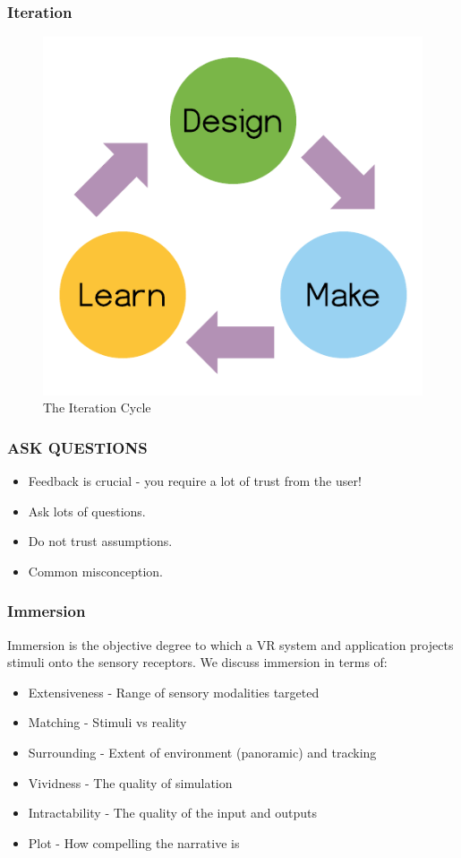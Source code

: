 \begin{frame}
	\frametitle{Iteration}
	\begin{figure}
		\includegraphics[scale=0.4]{assets/iteration.png}
		\caption{The Iteration Cycle}
	\end{figure}
\end{frame}

\begin{frame}
	\frametitle{\textbf{ASK QUESTIONS}}
	\begin{itemize}
		\item Feedback is crucial - you require a lot of trust from the user! 
		\item Ask lots of questions.
		\item Do not trust assumptions. 
		\item Common misconception.
	\end{itemize}
\end{frame}


\begin{frame}
	\frametitle{Immersion}
	Immersion is the objective degree to which a VR system and application projects stimuli onto the sensory receptors. We discuss immersion in terms of:

	\begin{itemize}
		\item Extensiveness - Range of sensory modalities targeted 
		\item Matching - Stimuli vs reality
		\item Surrounding - Extent of environment (panoramic) and tracking
		\item Vividness - The quality of simulation
		\item Intractability - The quality of the input and outputs
		\item Plot - How compelling the narrative is
	\end{itemize}
\end{frame}


